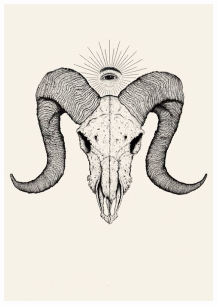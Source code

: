 \documentclass[]{article} %
\begin{document}
        \begin{figure} 
            \includegraphics[width=\textwidth]{dd70b1b87d300d20fcfaf566f13de977.jpg}
        \end{figure}

\end{document}

